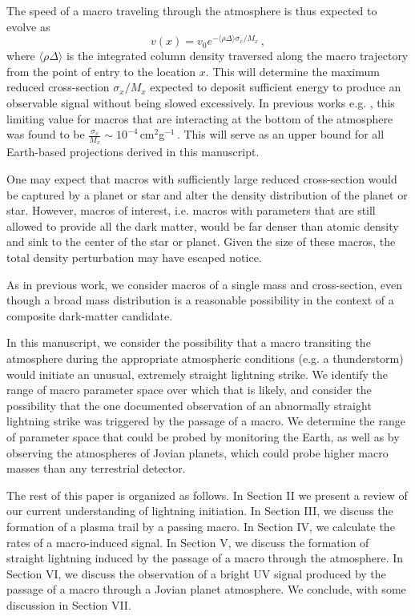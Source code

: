\documentclass[%
 reprint,
 amsmath,amssymb,
 aps,
]{revtex4-2}
\begin{document}
    The speed of a macro traveling through the atmosphere is thus expected to evolve as
    \begin{equation}\label{eq:atmo_velocity}
        v(x) = v_{0} e^{-\langle \rho \Delta\rangle \sigma_x/{M_x}}\,,
    \end{equation}
    where $\langle \rho \Delta\rangle$ is the integrated column density traversed along the macro trajectory from the point of entry to the location $x$. This will determine the maximum reduced cross-section $\sigma_x/M_x$ expected to deposit sufficient energy to produce an observable signal without being slowed excessively. In previous works e.g. \citet{Sidhu2019death, Sidhu2019bolide}, this limiting value for macros that are interacting at the bottom of the atmosphere was found to be $\frac{\sigma_x}{M_x} \sim 10^{-4}\,$cm$^2$g$^{-1}\,$. This will serve as an upper bound for all Earth-based projections derived in this manuscript.

    One may expect that macros with sufficiently large reduced cross-section would be captured by a planet or star and alter the density distribution of the planet or star. However, macros of interest, i.e. macros with parameters that are still allowed to provide all the dark matter, would be far denser than atomic density and sink to the center of the star or planet. Given the size of these macros, the total density perturbation may have escaped notice.

    As in previous work, we consider macros of a single mass and cross-section, even though a broad mass distribution is a reasonable possibility in the context of a composite dark-matter candidate.

    In this manuscript, we consider the possibility that a macro transiting the atmosphere during the appropriate atmospheric conditions (e.g. a thunderstorm) would initiate an unusual, extremely straight lightning strike. We identify the range of macro parameter space over which that is likely, and consider the possibility that the one documented observation of an abnormally straight lightning strike was triggered by the passage of a macro.  We determine the range of parameter space that could be probed by monitoring the Earth, as well as by observing the atmospheres of Jovian planets, which could probe higher macro masses than any terrestrial detector. 

    The rest of this paper is organized as follows. In Section II we present a review of our current understanding of lightning initiation. In Section III, we discuss the formation of a plasma trail by a passing macro. In Section IV, we calculate the rates of a macro-induced signal. In Section V, we discuss the formation of straight lightning induced by the passage of a macro through the atmosphere. In Section VI, we discuss the observation of a bright UV signal produced by the passage of a macro through a Jovian planet atmosphere. We conclude, with some discussion in Section VII.
\end{document}
